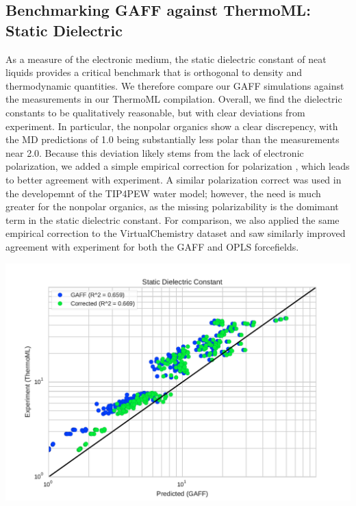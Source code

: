 \documentclass[aps,pre,twocolumn,superscriptaddress]{revtex4-1}
\begin{document}
\subsection{Benchmarking GAFF against ThermoML: Static Dielectric}

As a measure of the electronic medium, the static dielectric constant of neat liquids provides a critical benchmark that is orthogonal to density and thermodynamic quantities.  We therefore compare our GAFF simulations against the measurements in our ThermoML compilation.  Overall, we find the dielectric constants to be qualitatively reasonable, but with clear deviations from experiment.  In particular, the nonpolar organics show a clear discrepency, with the MD predictions of 1.0 being substantially less polar than the measurements near 2.0.  Because this deviation likely stems from the lack of electronic polarization, we added a simple empirical correction for polarization \cite{bosque2002polarizabilities}, which leads to better agreement with experiment.  A similar polarization correct was used in the developemnt of the TIP4PEW water model; however, the need is much greater for the nonpolar organics, as the missing polarizability is the domimant term in the static dielectric constant.  For comparison, we also applied the same empirical correction to the VirtualChemistry dataset and saw similarly improved agreement with experiment for both the GAFF and OPLS forcefields.


\includegraphics[width=\columnwidth]{./figures/dielectrics_thermoml.pdf}
\end{document}
